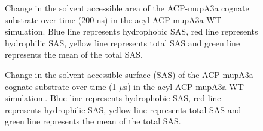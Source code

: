 \begin{singlespacing}
		\setlength\fboxsep{5pt}
		\setlength\fboxrule{1.5pt}
		\begin{figure}[htbp]
		\centering
		\caption[Change in the solvent accessible surface (SAS) of the ACP-mupA3a cognate substrate over time (200 ns) in the acyl ACP-mupA3a WT simulation.]{Change in the solvent accessible area of the ACP-mupA3a cognate substrate over time (200 ns) in the acyl ACP-mupA3a WT simulation. Blue line represents hydrophobic SAS, red line represents hydrophilic SAS, yellow line represents total SAS and green line represents the mean of the total SAS.}
		\label{fig:sasACPSPMWild200_area}
		\end{figure}

		\setlength\fboxsep{5pt}
		\setlength\fboxrule{1.5pt}
		\begin{figure}[htbp]
		\centering
		\caption[Change in the solvent accessible surface (SAS) of the ACP-mupA3a cognate substrate over time (1 $ \mu $s) in the acyl ACP-mupA3a WT simulation.]{Change in the solvent accessible surface (SAS) of the ACP-mupA3a cognate substrate over time (1 $ \mu $s) in the acyl ACP-mupA3a WT simulation.. Blue line represents hydrophobic SAS, red line represents hydrophilic SAS, yellow line represents total SAS and green line represents the mean of the total SAS.}
		\label{fig:sasACPSPMWild1000_area}
		\end{figure}
		

\end{singlespacing}
